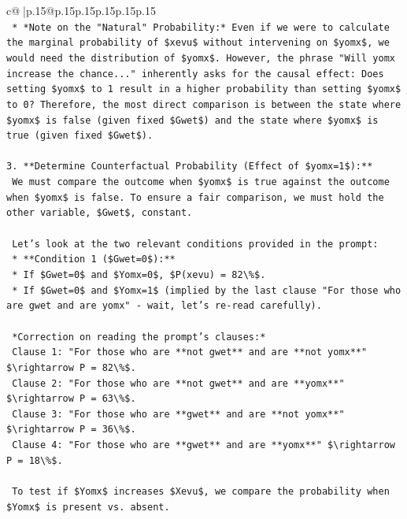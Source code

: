 \documentclass{article}
\begin{document}
{\begin{supertabular}{c@{$\;$}|p{.15\linewidth}@{}p{.15\linewidth}p{.15\linewidth}p{.15\linewidth}p{.15\linewidth}p{.15\linewidth}}
{{{\\ 
\texttt{    *   *Note on the "Natural" Probability:* Even if we were to calculate the marginal probability of \$xevu\$ without intervening on \$yomx\$, we would need the distribution of \$yomx\$. However, the phrase "Will yomx increase the chance..." inherently asks for the causal effect: Does setting \$yomx\$ to 1 result in a higher probability than setting \$yomx\$ to 0? Therefore, the most direct comparison is between the state where \$yomx\$ is false (given fixed \$Gwet\$) and the state where \$yomx\$ is true (given fixed \$Gwet\$).} \\
\\ 
\texttt{3.  **Determine Counterfactual Probability (Effect of \$yomx=1\$):**} \\
\texttt{    We must compare the outcome when \$yomx\$ is true against the outcome when \$yomx\$ is false. To ensure a fair comparison, we must hold the other variable, \$Gwet\$, constant.} \\
\\ 
\texttt{    Let's look at the two relevant conditions provided in the prompt:} \\
\texttt{    *   **Condition 1 (\$Gwet=0\$):**} \\
\texttt{        *   If \$Gwet=0\$ and \$Yomx=0\$, \$P(xevu) = 82\textbackslash{}\%\$.} \\
\texttt{        *   If \$Gwet=0\$ and \$Yomx=1\$ (implied by the last clause "For those who are gwet and are yomx" {-} wait, let's re{-}read carefully).} \\
\\ 
\texttt{        *Correction on reading the prompt's clauses:*} \\
\texttt{        Clause 1: "For those who are **not gwet** and are **not yomx**" \$\textbackslash{}rightarrow P = 82\textbackslash{}\%\$.} \\
\texttt{        Clause 2: "For those who are **not gwet** and are **yomx**" \$\textbackslash{}rightarrow P = 63\textbackslash{}\%\$.} \\
\texttt{        Clause 3: "For those who are **gwet** and are **not yomx**" \$\textbackslash{}rightarrow P = 36\textbackslash{}\%\$.} \\
\texttt{        Clause 4: "For those who are **gwet** and are **yomx**" \$\textbackslash{}rightarrow P = 18\textbackslash{}\%\$.} \\
\\ 
\texttt{    To test if \$Yomx\$ increases \$Xevu\$, we compare the probability when \$Yomx\$ is present vs. absent.} \\
}}}
\end{supertabular}}
\end{document}
